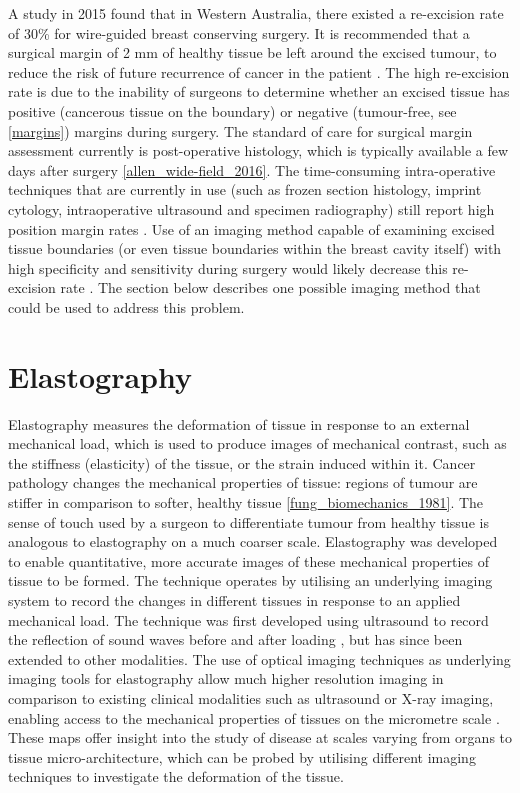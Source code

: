 A study in 2015 \cite{ballal_predictors_2015} found that in Western Australia, there existed a re-excision rate of 30\% for wire-guided breast conserving surgery. It is recommended that a surgical margin of 2 mm of healthy tissue be left around the excised tumour, to reduce the risk of future recurrence of cancer in the patient \cite{behm_surgical_2013}. The high re-excision rate is due to the inability of surgeons to determine whether an excised tissue has positive (cancerous tissue on the boundary) or negative (tumour-free, see \autoref{margins}) margins during surgery. The standard of care for surgical margin assessment currently is post-operative histology, which is typically available a few days after surgery \ref{allen_wide-field_2016}. The time-consuming intra-operative techniques that are currently in use (such as frozen section histology, imprint cytology, intraoperative ultrasound and specimen radiography) still report high position margin rates \cite{cabioglu_role_2007}. Use of an imaging method capable of examining excised tissue boundaries (or even tissue boundaries within the breast cavity itself) with high specificity and sensitivity during surgery would likely decrease this re-excision rate \cite{ballal_predictors_2015}. The section below describes one possible imaging method that could be used to address this problem. 

\section{Elastography}\label{elastography}
Elastography measures the deformation of tissue in response to an external mechanical load, which is used to produce images of mechanical contrast, such as the stiffness (elasticity) of the tissue, or the strain induced within it. Cancer pathology changes the mechanical properties of tissue: regions of tumour are stiffer in comparison to softer, healthy tissue \ref{fung_biomechanics_1981}. The sense of touch used by a surgeon to differentiate tumour from healthy tissue is analogous to elastography on a much coarser scale. 
Elastography was developed to enable quantitative, more accurate images of these mechanical properties of tissue to be formed. The technique operates by utilising an underlying imaging system to record the changes in different tissues in response to an applied mechanical load. The technique was first developed using ultrasound to record the reflection of sound waves before and after loading \cite{ophir_elastography:_1991}, but has since been extended to other modalities. The use of optical imaging techniques as underlying imaging tools for elastography allow much higher resolution imaging in comparison to existing clinical modalities such as ultrasound or X-ray imaging, enabling access to the mechanical properties of tissues on the micrometre scale \cite{schmitt_oct_1998} \cite{kennedy_review_2014}.
These maps offer insight into the study of disease at scales varying from organs to tissue micro-architecture, which can be probed by utilising different imaging techniques to investigate the deformation of the tissue.

